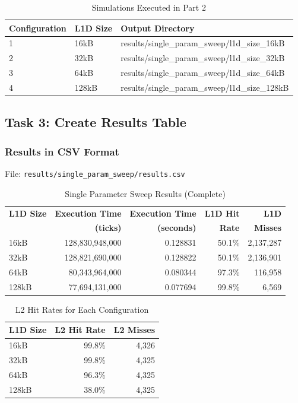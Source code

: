 \documentclass[11pt,a4paper]{article}
\begin{document}
\begin{table}[H]
\centering
\caption{Simulations Executed in Part 2}
\begin{tabular}{lll}
\toprule
\textbf{Configuration} & \textbf{L1D Size} & \textbf{Output Directory} \\
\midrule
1 & 16kB & results/single\_param\_sweep/l1d\_size\_16kB \\
2 & 32kB & results/single\_param\_sweep/l1d\_size\_32kB \\
3 & 64kB & results/single\_param\_sweep/l1d\_size\_64kB \\
4 & 128kB & results/single\_param\_sweep/l1d\_size\_128kB \\
\bottomrule
\end{tabular}
\end{table}

\subsection{Task 3: Create Results Table}

\subsubsection{Results in CSV Format}

File: \texttt{results/single\_param\_sweep/results.csv}

\begin{table}[H]
\centering
\caption{Single Parameter Sweep Results (Complete)}
\begin{tabular}{lrrrr}
\toprule
\textbf{L1D Size} & \textbf{Execution Time} & \textbf{Execution Time} & \textbf{L1D Hit} & \textbf{L1D} \\
 & \textbf{(ticks)} & \textbf{(seconds)} & \textbf{Rate} & \textbf{Misses} \\
\midrule
16kB  & 128,830,948,000 & 0.128831 & 50.1\% & 2,137,287 \\
32kB  & 128,821,690,000 & 0.128822 & 50.1\% & 2,136,901 \\
64kB  & 80,343,964,000  & 0.080344 & 97.3\% & 116,958 \\
128kB & 77,694,131,000  & 0.077694 & 99.8\% & 6,569 \\
\bottomrule
\end{tabular}
\end{table}

\begin{table}[H]
\centering
\caption{L2 Hit Rates for Each Configuration}
\begin{tabular}{lrr}
\toprule
\textbf{L1D Size} & \textbf{L2 Hit Rate} & \textbf{L2 Misses} \\
\midrule
16kB  & 99.8\% & 4,326 \\
32kB  & 99.8\% & 4,325 \\
64kB  & 96.3\% & 4,325 \\
128kB & 38.0\% & 4,325 \\
\bottomrule
\end{tabular}
\end{table}
\end{document}
